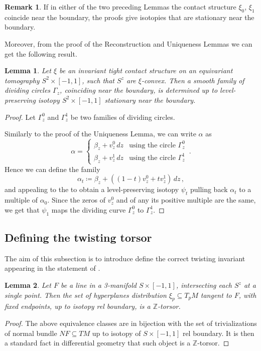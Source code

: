 \documentclass[a4paper, 11pt]{amsart}
\theoremstyle{plain}
\newtheorem{lemma}[lemma]{Lemma}
\theoremstyle{definition}
\newtheorem{rmk}[rmk]{Remark}
\newcommand{\Z}{\mathbb{Z}}
\begin{document}
\begin{rmk}\label{rmkboundary}
	If in either of the two preceding Lemmas the contact structure $\xi_0$, $\xi_1$ coincide near the boundary, the proofs give isotopies that are stationary near the boundary.
\end{rmk}
Moreover, from the proof of the Reconstruction and Uniqueness Lemmas we can get the following result.
\begin{lemma}\label{parametricdividedetermined}
	Let $\xi$ be an invariant tight contact structure on an equivariant tomography $S^2 \times [-1,1]$, such that $S^z$ are $\xi$-convex. Then a smooth family of dividing circles $\Gamma_z$, coinciding near the boundary, is determined up to level-preserving isotopy $S^2 \times [-1,1]$ stationary near the boundary.
\end{lemma}
\begin{proof}
	Let $\Gamma_z^0$ and $\Gamma_z^1$ be two families of dividing circles.
	
	Similarly to the proof of the Uniqueness Lemma, we can write $\alpha$ as
	\[
		\alpha = 
		\begin{cases}
			\beta_z + v^0_z\,dz & \text{using the circle $\Gamma^0_z$}\\
			\beta_z + v^1_z\,dz & \text{using the circle $\Gamma^1_z$}
		\end{cases}\,.
	\]
	Hence we can define the family
	\[
		\alpha_t \coloneqq \beta_z + ((1-t)v^0_z + tv^1_z)\,dz\,,
	\]
	and appealing to the  to obtain a level-preserving isotopy $\psi_t$ pulling back $\alpha_t$ to a multiple of $\alpha_0$. Since the zeros of $v^0_z$ and of any its positive multiple are the same, we get that $\psi_1$ maps the dividing curve $\Gamma^0_z$ to $\Gamma^1_z$.	
\end{proof}
\subsection{Defining the twisting torsor}
The aim of this subsection is to introduce define the correct twisting invariant appearing in the statement of . 





\begin{lemma}\label{twZtorsor}
	Let $F$ be a line in a 3-manifold $S \times [-1,1]$, intersecting each $S^z$ at a single point. Then the set of hyperplanes distribution $\xi_p \subseteq T_pM$ tangent to $F$, with fixed endpoints, up to isotopy rel boundary, is a $\Z$-torsor.
\end{lemma}
\begin{proof}
	The above equivalence classes are in bijection with the set of trivializations of normal bundle $NF \subseteq TM$ up to isotopy of $S \times [-1,1]$ rel boundary. It is then a standard fact in differential geometry that such object is a $\Z$-torsor.
\end{proof}
\end{document}
